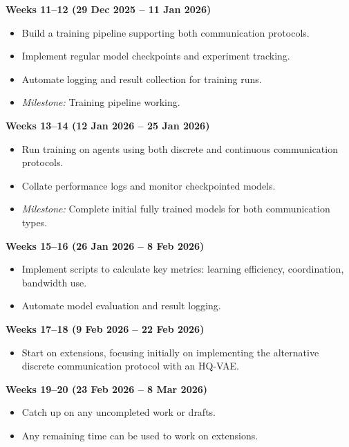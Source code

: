 \begin{list}{}{\leftmargin=0cm \itemindent=0cm}
\item \textbf{Weeks 11--12 (29 Dec 2025 -- 11 Jan 2026)}
\begin{itemize}
\item Build a training pipeline supporting both communication protocols.
\item Implement regular model checkpoints and experiment tracking.
\item Automate logging and result collection for training runs.
\item \textit{Milestone:} Training pipeline working.
\end{itemize}

\item \textbf{Weeks 13--14 (12 Jan 2026 -- 25 Jan 2026)}
\begin{itemize}
\item Run training on agents using both discrete and continuous communication protocols.
\item Collate performance logs and monitor checkpointed models.
\item \textit{Milestone:} Complete initial fully trained models for both communication types.
\end{itemize}

\item \textbf{Weeks 15--16 (26 Jan 2026 -- 8 Feb 2026)}
\begin{itemize}
\item Implement scripts to calculate key metrics: learning efficiency, coordination, bandwidth use.
\item Automate model evaluation and result logging.
\end{itemize}

\item \textbf{Weeks 17--18 (9 Feb 2026 -- 22 Feb 2026)}
\begin{itemize}
\item Start on extensions, focusing initially on implementing the alternative discrete communication protocol with an HQ-VAE.
\end{itemize}


\item \textbf{Weeks 19--20 (23 Feb 2026 -- 8 Mar 2026)}
\begin{itemize}
\item Catch up on any uncompleted work or drafts.
\item Any remaining time can be used to work on extensions.
\end{itemize}



\end{list}
